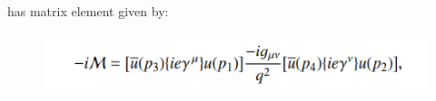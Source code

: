 \documentclass[10pt]{article}
\theoremstyle{definition}
\begin{document}
has matrix element given by:

\begin{figure}[H]
    \centering
    \includegraphics[scale=0.65]{feynman 5.7.png}
\end{figure}



\end{document}
